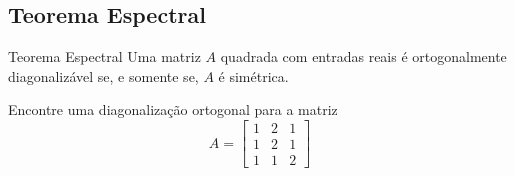 \subsection*{Teorema Espectral}

\begin{frame}[label=orto]{}

\begin{block}{Teorema Espectral}
Uma matriz  $A$ quadrada com entradas reais  é ortogonalmente diagonalizável se, e somente se, $A$ é simétrica.
\end{block}

\begin{exe}
Encontre  uma diagonalização ortogonal para a matriz
\[A=
\begin{bmatrix}
1 & 2 & 1\\ 1& 2 & 1 \\ 1 & 1 & 2
\end{bmatrix}
\]
\end{exe}

\end{frame}
